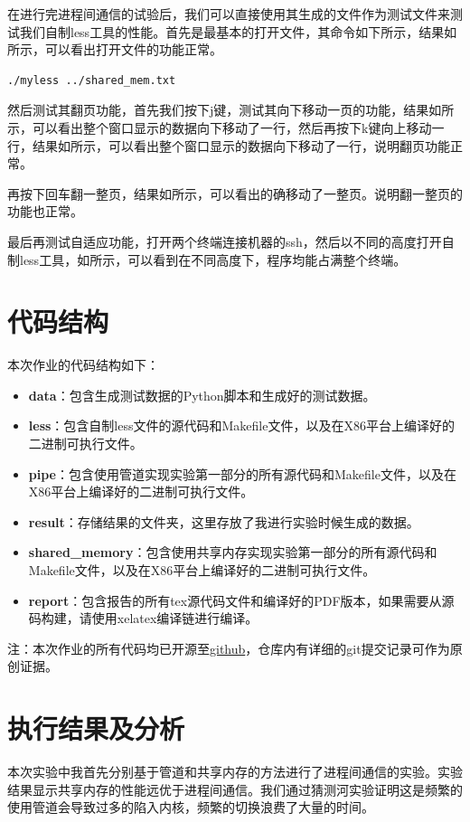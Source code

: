 \documentclass[lang=cn,a4paper,newtx]{elegantpaper}
\begin{document}
在进行完进程间通信的试验后，我们可以直接使用其生成的文件作为测试文件来测试我们自制less工具的性能。首先是最基本的打开文件，其命令如下所示，结果如所示，可以看出打开文件的功能正常。
\begin{lstlisting}[language=bash]
    ./myless ../shared_mem.txt
\end{lstlisting}

然后测试其翻页功能，首先我们按下j键，测试其向下移动一页的功能，结果如所示，可以看出整个窗口显示的数据向下移动了一行，然后再按下k键向上移动一行，结果如所示，可以看出整个窗口显示的数据向下移动了一行，说明翻页功能正常。

再按下回车翻一整页，结果如所示，可以看出的确移动了一整页。说明翻一整页的功能也正常。

最后再测试自适应功能，打开两个终端连接机器的ssh，然后以不同的高度打开自制less工具，如所示，可以看到在不同高度下，程序均能占满整个终端。

\section{代码结构}

本次作业的代码结构如下：
\begin{itemize}
    \item \textbf{data}：包含生成测试数据的Python脚本和生成好的测试数据。
    \item \textbf{less}：包含自制less文件的源代码和Makefile文件，以及在X86平台上编译好的二进制可执行文件。
    \item \textbf{pipe}：包含使用管道实现实验第一部分的所有源代码和Makefile文件，以及在X86平台上编译好的二进制可执行文件。
    \item \textbf{result}：存储结果的文件夹，这里存放了我进行实验时候生成的数据。
    \item \textbf{shared\_memory}：包含使用共享内存实现实验第一部分的所有源代码和Makefile文件，以及在X86平台上编译好的二进制可执行文件。
    \item  \textbf{report}：包含报告的所有tex源代码文件和编译好的PDF版本，如果需要从源码构建，请使用xelatex编译链进行编译。
\end{itemize}

注：本次作业的所有代码均已开源至\href{https://github.com/wtyqqq/OS_Assignment}{github}，仓库内有详细的git提交记录可作为原创证据。
\section{执行结果及分析}

本次实验中我首先分别基于管道和共享内存的方法进行了进程间通信的实验。实验结果显示共享内存的性能远优于进程间通信。我们通过猜测河实验证明这是频繁的使用管道会导致过多的陷入内核，频繁的切换浪费了大量的时间。
% 
\printbibliography[heading=bibintoc, title=\ebibname,sorting=none]

\appendix
\addappheadtotoc
\end{document}
